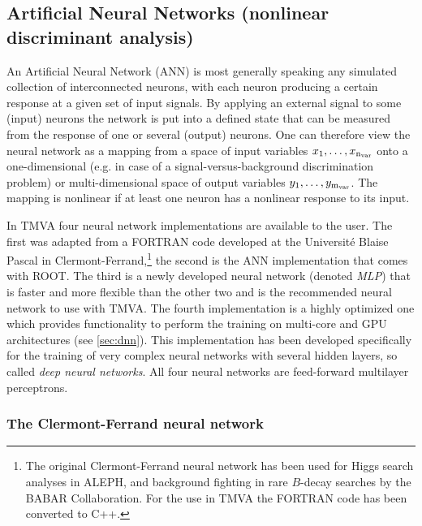\subsection{Artificial Neural Networks
 (nonlinear discriminant analysis)}
\label{sec:ann}

An Artificial Neural Network  (ANN)
is most generally speaking any simulated collection of interconnected
neurons, with each neuron producing a certain response at a given set
of input signals. By applying an external signal to some (input)
neurons the network is put into a defined state that can be measured
from the response of one or several (output) neurons. One can therefore
view the neural network as a mapping from a space of input variables
$x_1,\dots, x_{\rm n_{var}}$ onto a one-dimensional (e.g. in case of a 
signal-versus-background discrimination problem) or multi-dimensional 
space of output variables $y_1,\dots, y_{\rm m_{var}}$. The mapping is 
nonlinear if at least one neuron has a nonlinear response to its input.

In TMVA four neural network implementations are available to the user. The
first was adapted from a FORTRAN code developed at the Universit\'e Blaise
Pascal in Clermont-Ferrand,\footnote
{
   The original Clermont-Ferrand neural network has been used for Higgs 
   search analyses in ALEPH, and background fighting in rare $B$-decay
   searches by the BABAR Collaboration. For the use in TMVA the FORTRAN 
   code has been converted to C++.
} 
the second is the ANN implementation that comes with ROOT. The third
is a newly developed neural network (denoted {\em MLP}) that is faster
and more flexible than the other two and is the recommended neural
network to use with TMVA. The fourth implementation is a highly
optimized one which provides functionality to perform the training on
multi-core and GPU architectures (see \ref{sec:dnn}). This
implementation has been developed specifically for the training of
very complex neural networks with several hidden layers, so called
\textit{deep neural networks}. All four neural networks are
feed-forward multilayer perceptrons.  

\subsubsection*{The Clermont-Ferrand neural network}

